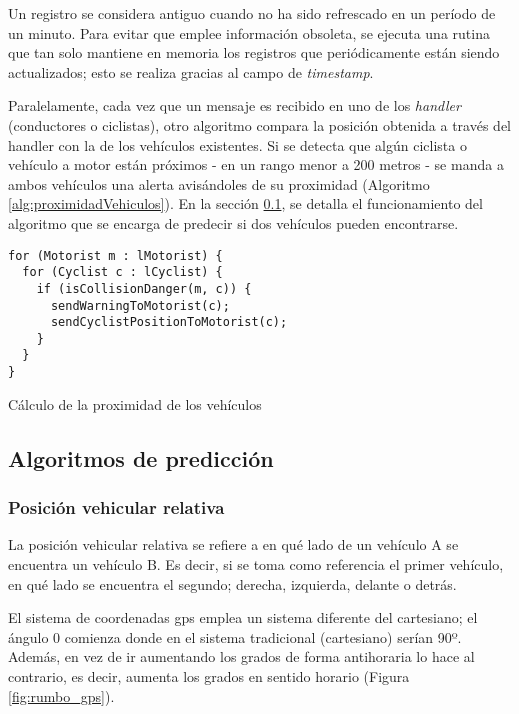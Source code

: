 Un registro se considera antiguo cuando no ha sido refrescado en un período de
un minuto. Para evitar que emplee información obsoleta, se ejecuta una rutina
que tan solo mantiene en memoria los registros que periódicamente están siendo
actualizados; esto se realiza gracias al campo de \emph{timestamp}.

Paralelamente, cada vez que un mensaje es recibido en uno de los \emph{handler}
(conductores o ciclistas), otro algoritmo compara la posición obtenida a través
del handler con la de los vehículos existentes. Si se detecta que algún
ciclista o vehículo a motor están próximos - en un rango menor a 200 metros -
se manda a ambos vehículos una alerta avisándoles de su proximidad (Algoritmo
\ref{alg:proximidadVehiculos}). En la sección \ref{ssection:algPrediccion}, se
detalla el funcionamiento del algoritmo que se encarga de predecir si dos
vehículos pueden encontrarse.

\begin{listing}
	\begin{minipage}{.4\textwidth}
		\begin{verbatim}
for (Motorist m : lMotorist) {
  for (Cyclist c : lCyclist) {
    if (isCollisionDanger(m, c)) {
      sendWarningToMotorist(c);
      sendCyclistPositionToMotorist(c);
    }
  }
}
		\end{verbatim}
	\end{minipage}
	\caption{Cálculo de la proximidad de los vehículos}
	\label{alg:proximidadVehiculos}
\end{listing}

\FloatBarrier
\subsection{Algoritmos de predicción}\label{ssection:algPrediccion}
\subsubsection{Posición vehicular relativa}
La posición vehicular relativa se refiere a en qué lado de un vehículo A se
encuentra un vehículo B. Es decir, si se toma como referencia el primer
vehículo, en qué lado se encuentra el segundo; derecha, izquierda, delante o
detrás.

El sistema de coordenadas \gls{gps} emplea un sistema diferente del cartesiano;
el ángulo 0 comienza donde en el sistema tradicional (cartesiano) serían 90º.
Además, en vez de ir aumentando los grados de forma antihoraria lo hace al
contrario, es decir, aumenta los grados en sentido horario (Figura
\ref{fig:rumbo_gps}).


